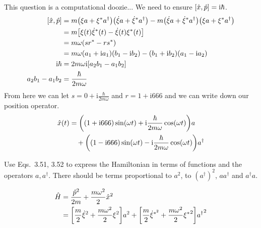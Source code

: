 \documentclass[boxes,pages]{homework}
\makeatletter
\newcommand{\iu}{\mathrm{i}}
\numberwithin{@problem}{section}
\makeatother
\begin{document}
\begin{solution}
	This question is a computational doozie... We need to ensure $\comm{\hat{x}}{\hat{p}} = \iu\hbar$.
	\begin{align*}
		\comm{\hat{x}}{\hat{p}} & = m\qty(\xi a + \xi^*a^\dagger)\qty(\dot{\xi}a + \dot{\xi}^*a^\dagger) - m\qty(\dot{\xi}a + \dot{\xi}^*a^\dagger)\qty(\xi a + \xi^*a^\dagger) \\
														& = m\qty[\xi(t)\dot{\xi}^*(t) - \dot{\xi}(t)\xi^*(t)] \\
														& = m\omega\qty(sr^* -rs^*) \\
														& = m\omega\qty(a_1 + \iu a_1)\qty(b_1 - \iu b_2) - (b_1 + \iu b_2)\qty(a_1 - \iu a_2) \\
									 \iu\hbar & = 2m\omega\iu\qty[a_2b_1 - a_1b_2] \\
						a_2b_1 - a_1b_2 & = \frac{\hbar}{2m\omega}
	\end{align*}
	From here we can let $s = 0 + \iu \frac{\hbar}{2m\omega}$ and $r = 1 + \iu 666$ and we can write down our position operator.
	\begin{align*}
		\hat{x}(t) & = \qty((1 + \iu 666)\sin(\omega t) + \iu\frac{\hbar}{2m\omega}\cos(\omega t))a \\
		& \quad + \qty((1 - \iu 666)\sin(\omega t) - \iu\frac{\hbar}{2m\omega}\cos(\omega t))a^\dagger
	\end{align*}
\end{solution}

\begin{problem}
	Use Eqs.\ 3.51, 3.52 to express the Hamiltonian in terms of functions and the operators $a, a^\dagger$. There should be terms proportional to $a^2$, to $(a^\dagger)^2$, $aa^\dagger$ and $a^\dagger a$.
\end{problem}

\begin{solution}
	\begin{align*}
		\hat{H} & = \frac{\hat{p}^2}{2m} + \frac{m\omega^2}{2}\hat{x}^2 \\
						& = \qty[\frac{m}{2}\dot{\xi}^2 + \frac{m\omega^2}{2}\xi^2]a^2 + \qty[\frac{m}{2}\dot{\xi}^{*^2} + \frac{m\omega^2}{2}{\xi^*}^2]{a^\dagger}^2 \\
	\end{align*}
\end{solution}
\end{document}
